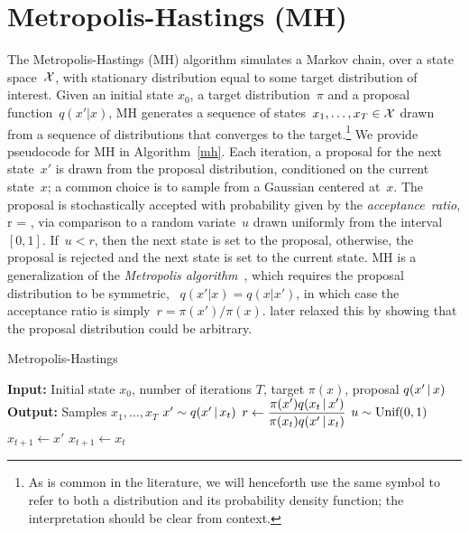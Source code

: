 \documentclass[angelino.tex]{subfiles}
\begin{document}
\section{Metropolis-Hastings (MH)}

The Metropolis-Hastings (MH) algorithm simulates a Markov chain, over a
state space~${\mathcal X}$, with stationary distribution equal to some target
distribution of interest.
Given an initial state $x_0$, a target distribution~$\pi$ and
a proposal function~$q(x' \vert x)$,
MH generates a sequence of states~$x_1, \dots, x_T \in {\mathcal X}$
drawn from a sequence of distributions that converges to the target.\footnote{
As is common in the literature, we will henceforth use the same symbol
to refer to both a distribution and its probability density function;
the interpretation should be clear from context.}
We provide pseudocode for MH in Algorithm~\ref{mh}.
Each iteration, a proposal for the next state~$x'$ is drawn from the
proposal distribution, conditioned on the current state~$x$;
\eg a common choice is to sample from a Gaussian centered at~$x$.
The proposal is stochastically accepted with probability given by the 
\emph{acceptance~ratio},
\be
r = ,
\ee
via comparison to a random variate~$u$ drawn uniformly from the interval~$[0, 1]$.
If~${u < r}$, then the next state is set to the proposal, otherwise,
the proposal is rejected and the next state is set to the current state.
MH is a generalization of the \emph{Metropolis algorithm}~\citep{metropolis-1953}, 
which requires the proposal distribution to be symmetric,
\ie~${q(x' \vert x) = q(x \vert x')}$, in which case
the acceptance ratio is simply~${r = \pi(x') / \pi(x)}$.
\citet{hastings-1970} later relaxed this by showing that the proposal
distribution could be arbitrary.

\begin{algorithm}[t]
\caption{Metropolis-Hastings}
\label{mh}
\begin{algorithmic}
\State \textbf{Input:} Initial state $x_0$, number of iterations $T$, target $\pi(x)$, proposal $q(x' \,|\, x)$
\State \textbf{Output:} Samples $x_1, \dots, x_T$
\State $x' \sim q(x' \,|\, x_t)$ 
\State $r \gets \dfrac{\pi(x') q(x_t \,|\, x')}{\pi(x_t) q(x' \,|\, x_t)}$
\State $u \sim \mbox{Unif}(0, 1)$ 
    \State $x_{t+1} \gets x'$ 
\Else
    \State $x_{t+1} \gets x_t$ 
\EndIf
\EndFor
\end{algorithmic}
\end{algorithm}
\end{document}
